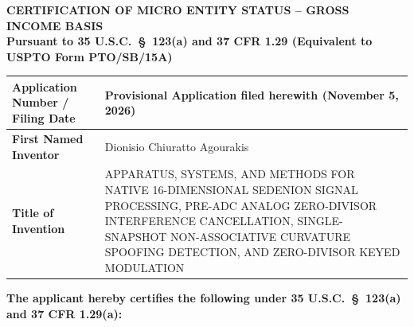 \documentclass[11pt,letterpaper]{article}
\begin{document}
\begin{center}
    {\large \textbf{CERTIFICATION OF MICRO ENTITY STATUS -- GROSS INCOME BASIS}}\\[2pt]
    {\small \textbf{Pursuant to 35 U.S.C.\ \S\ 123(a) and 37 CFR 1.29 (Equivalent to USPTO Form PTO/SB/15A)}}
\end{center}
\vspace{4pt}

\begin{tabular}{|p{2.2in}|p{4.5in}|}
\hline
\textbf{Application Number / Filing Date} & Provisional Application filed herewith (November 5, 2026) \\
\hline
\textbf{First Named Inventor} & Dionisio Chiuratto Agourakis \\
\hline
\textbf{Title of Invention} & APPARATUS, SYSTEMS, AND METHODS FOR NATIVE 16-DIMENSIONAL SEDENION SIGNAL PROCESSING, PRE-ADC ANALOG ZERO-DIVISOR INTERFERENCE CANCELLATION, SINGLE-SNAPSHOT NON-ASSOCIATIVE CURVATURE SPOOFING DETECTION, AND ZERO-DIVISOR KEYED MODULATION \\
\hline
\end{tabular}

\vspace{8pt}
\textbf{The applicant hereby certifies the following under 35 U.S.C.\ \S\ 123(a) and 37 CFR 1.29(a):}
\end{document}
